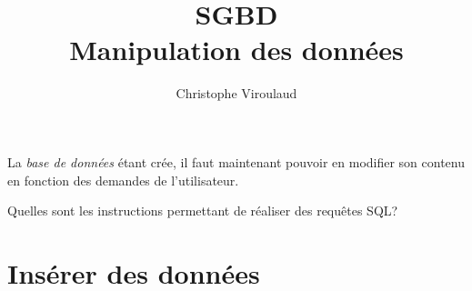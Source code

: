 \documentclass[svgnames,11pt]{beamer}
\author[]{Christophe Viroulaud}
\title{SGBD\\Manipulation des données}
\date{\framebox{\textbf{BDD 04}}}
\institute{Terminale - NSI}
\begin{document}
\begin{frame}
    \titlepage
\end{frame}
\begin{frame}
    \frametitle{}

    La \emph{base de données} étant crée, il faut maintenant pouvoir en modifier son contenu en fonction des demandes de l'utilisateur.

    \begin{framed}
        Quelles sont les instructions permettant de réaliser des requêtes SQL?
    \end{framed}

\end{frame}
\section{Insérer des données}
\end{document}

